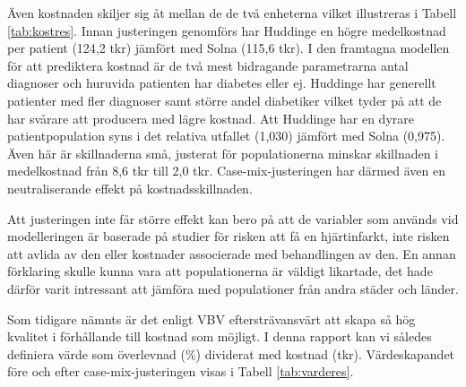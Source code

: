 Även kostnaden skiljer sig åt mellan de de två enheterna vilket illustreras i Tabell \ref{tab:kostres}. Innan justeringen genomförs har Huddinge en högre medelkostnad per patient (124,2 tkr) jämfört med Solna (115,6 tkr). I den framtagna modellen för att prediktera kostnad är de två mest bidragande parametrarna antal diagnoser och huruvida patienten har diabetes eller ej. Huddinge har generellt patienter med fler diagnoser samt större andel diabetiker vilket tyder på att de har svårare att producera med lägre kostnad. Att Huddinge har en dyrare patientpopulation syns i det relativa utfallet (1,030) jämfört med Solna (0,975). Även här är skillnaderna små, justerat för populationerna minskar skillnaden i medelkostnad från 8,6 tkr till 2,0 tkr. Case-mix-justeringen har därmed även en neutraliserande effekt på kostnadsskillnaden.

Att justeringen inte får större effekt kan bero på att de variabler som används vid modelleringen är baserade på studier för risken att få en hjärtinfarkt, inte risken att avlida av den eller kostnader associerade med behandlingen av den. En annan förklaring skulle kunna vara att populationerna är väldigt likartade, det hade därför varit intressant att jämföra med populationer från andra städer och länder.

 

Som tidigare nämnts är det enligt VBV eftersträvansvärt att skapa så hög kvalitet i förhållande till kostnad som möjligt. I denna rapport kan vi således definiera värde som överlevnad (\%) dividerat med kostnad (tkr). Värdeskapandet före och efter case-mix-justeringen visas i Tabell \ref{tab:varderes}.

